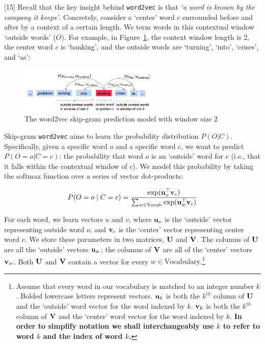 [15]
Recall that the key insight behind {\tt word2vec} is that \textit{`a word is known by the company it keeps'}. Concretely, consider a `center' word $c$ surrounded before and after by a context of a certain length. We term words in this contextual window `outside words' ($O$). For example, in Figure~\ref{fig:word2vec}, the context window length is 2, the center word $c$ is `banking', and the outside words are `turning', `into', `crises', and `as':

\begin{figure}[h]
    \centering
    \includegraphics[width=0.6\textwidth]{word2vec.png}
    \caption{The word2vec skip-gram prediction model with window size 2}
    \label{fig:word2vec}
\end{figure}

Skip-gram {\tt word2vec} aims to learn the probability distribution $P(O|C)$. 
Specifically, given a specific word $o$ and a specific word $c$, we want to predict $P(O=o|C=c)$: the probability that word $o$ is an `outside' word for $c$ (i.e., that it falls within the contextual window of $c$).
We model this probability by taking the softmax function over a series of vector dot-products: %

\begin{equation}
 P(O=o \mid C=c) = \frac{\exp(\mathbf{u}_{o}^\top \mathbf{v}_c)}{\sum_{w \in \text{Vocab}} \exp(\mathbf{u}_{w}^\top \mathbf{v}_c)}
 \label{word2vec_condprob}
\end{equation}

For each word, we learn vectors $u$ and $v$, where $\mathbf{u}_o$ is the `outside' vector representing outside word $o$, and $\mathbf{v}_c$ is the `center' vector representing center word $c$. 
We store these parameters in two matrices, $\mathbf{U}$ and $\mathbf{V}$.
The columns of $\mathbf{U}$ are all the `outside' vectors $\mathbf{u}_{w}$;
the columns of $\mathbf{V}$ are all of the `center' vectors $\mathbf{v}_{w}$. 
Both $\mathbf{U}$ and $\mathbf{V}$ contain a vector for every $w \in \text{Vocabulary}$.\footnote{Assume that every word in our vocabulary is matched to an integer number $k$. Bolded lowercase letters represent vectors. $\mathbf{u}_{k}$ is both the $k^{th}$ column of $\mathbf{U}$ and the `outside' word vector for the word indexed by $k$. $\mathbf{v}_k$ is both the $k^{th}$ column of $\mathbf{V}$ and the `center' word vector for the word indexed by $k$. \textbf{In order to simplify notation we shall interchangeably use $k$ to refer to word $k$ and the index of word $k$.}}\newline

